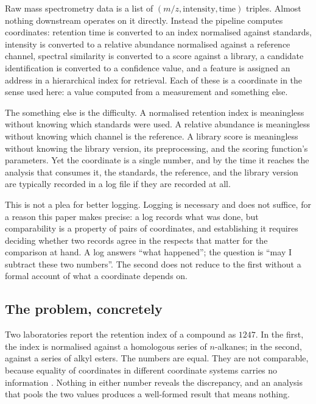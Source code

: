 \documentclass[11pt,a4paper]{article}
\theoremstyle{definition}
\theoremstyle{remark}
\begin{document}
Raw mass spectrometry data is a list of $(m/z, \text{intensity},
\text{time})$ triples. Almost nothing downstream operates on it directly.
Instead the pipeline computes coordinates: retention time is converted to
an index normalised against standards, intensity is converted to a
relative abundance normalised against a reference channel, spectral
similarity is converted to a score against a library, a candidate
identification is converted to a confidence value, and a feature is
assigned an address in a hierarchical index for retrieval. Each of these
is a coordinate in the sense used here: a value computed from a
measurement and something else.

The something else is the difficulty. A normalised retention index is
meaningless without knowing which standards were used. A relative
abundance is meaningless without knowing which channel is the reference.
A library score is meaningless without knowing the library version, its
preprocessing, and the scoring function's parameters. Yet the coordinate
is a single number, and by the time it reaches the analysis that consumes
it, the standards, the reference, and the library version are typically
recorded in a log file if they are recorded at all.

This is not a plea for better logging. Logging is necessary and does not
suffice, for a reason this paper makes precise: a log records what was
done, but comparability is a property of pairs of coordinates, and
establishing it requires deciding whether two records agree in the
respects that matter for the comparison at hand. A log answers ``what
happened''; the question is ``may I subtract these two numbers''. The
second does not reduce to the first without a formal account of what a
coordinate depends on.

\subsection{The problem, concretely}

Two laboratories report the retention index of a compound as $1247$. In
the first, the index is normalised against a homologous series of
$n$-alkanes; in the second, against a series of alkyl esters. The
numbers are equal. They are not comparable, because equality of
coordinates in different coordinate systems carries no information
\citep{vandendool1963generalization,krokhin2006sequence}. Nothing in
either number reveals the discrepancy, and an analysis that pools the two
values produces a well-formed result that means nothing.
\end{document}
